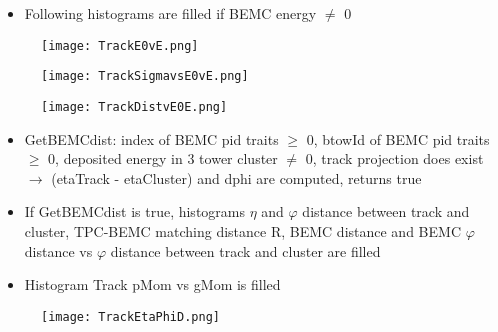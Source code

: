 \documentclass{beamer}
\begin{document}
\begin{frame}
	\begin{itemize}
		\item Following histograms are filled if BEMC energy $\neq$ 0
	\end{itemize}
\end{frame}

\begin{frame}
  \begin{figure}[h!]
  \centering
  \texttt{[image: TrackE0vE.png]}
  \end{figure}
\end{frame}



\begin{frame}
	\begin{figure}[h!]
		\centering
		\texttt{[image: TrackSigmavsE0vE.png]}
	\end{figure}
\end{frame}

\begin{frame}
  \begin{figure}[h!]
  \centering
  \texttt{[image: TrackDistvE0E.png]}
  \end{figure}
\end{frame}

\begin{frame}
  \begin{itemize}
    \item GetBEMCdist: index of BEMC pid traits $\geq$ 0, btowId of BEMC pid traits $\geq$ 0, deposited energy in 3 tower cluster $\neq$ 0, track projection does exist $\rightarrow$ (etaTrack - etaCluster) and dphi are computed, returns true
    \item If GetBEMCdist is true, histograms $\eta$ and $\varphi$ distance between track and cluster, TPC-BEMC matching distance R, BEMC distance and BEMC $\varphi$ distance vs $\varphi$ distance between track and cluster are filled
    \item Histogram Track pMom vs gMom is filled
    
  \end{itemize}
\end{frame}

\begin{frame}
  \begin{figure}[h!]
  \centering
  \texttt{[image: TrackEtaPhiD.png]}
  \end{figure}
\end{frame}
\end{document}
